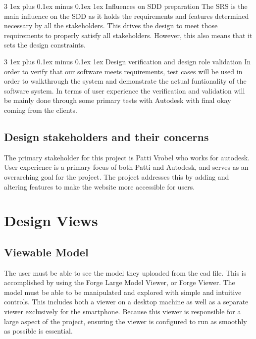 \documentclass[letterpaper, 10pt, draftclsnofoot, compsoc, onecolumn]{IEEEtran}
\makeatletter
\def\subsubsection{\@startsection{subsubsection}%
                                 {3}%
                                 {\z@}%
                                 {1ex plus 0.1ex minus 0.1ex}%
                                 {1ex}%
                                 {\normalfont\normalsize}}%
\makeatother
\begin{document}
\subsubsection{Influences on SDD preparation}
The SRS is the main influence on the SDD as it holds the requirements and features determined necessary by all the stakeholders. This drives the design to meet those requirements to properly satisfy all stakeholders. However, this also means that it sets the design constraints.

\subsubsection{Design verification and design role validation}
In order to verify that our software meets requirements, test cases will be used in order to walkthrough the system and demonstrate the actual funtionality of the software system. In terms of user experience the verification and validation will be mainly done through some primary tests with Autodesk with final okay coming from the clients.

\subsection{Design stakeholders and their concerns}
	The primary stakeholder for this project is Patti Vrobel who works for autodesk. User experience is a primary focus of both Patti and Autodesk, and serves as an overarching goal for the project. The project addresses this by adding and altering features to make the website more accessible for users.

\section{Design Views}

\subsection{Viewable Model}
The user must be able to see the model they uploaded from the cad file. This is accomplished by using the Forge Large Model Viewer, or Forge Viewer. The model must be able to be manipulated and explored with simple and intuitive controls. This includes both a viewer on a desktop machine as well as a separate viewer exclusively for the smartphone. Because this viewer is responsible for a large aspect of the project, ensuring the viewer is configured to run as smoothly as possible is essential.
\end{document}
